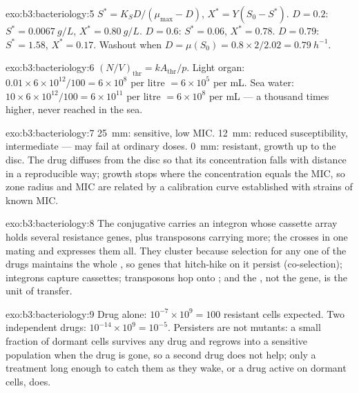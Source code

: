 \begin{solution}{exo:b3:bacteriology:5}
$S^{*} = K_{S}D/(\mu_{\max} - D)$, $X^{*} = Y(S_{0} - S^{*})$. $D = 0.2$:
$S^{*} = \qty{0.0067}{g/L}$, $X^{*} = \qty{0.80}{g/L}$. $D = 0.6$:
$S^{*} = 0.06$, $X^{*} = 0.78$. $D = 0.79$: $S^{*} = 1.58$, $X^{*} = 0.17$.
Washout when $D = \mu(S_{0}) = 0.8\times 2/2.02 = \qty{0.79}{h^{-1}}$.
\end{solution}

\begin{solution}{exo:b3:bacteriology:6}
$(N/V)_{\text{thr}} = kA_{\text{thr}}/p$. Light organ: $0.01\times
6\times 10^{12}/100 = 6\times 10^{8}$ per litre $= 6\times 10^{5}$ per
mL. Sea water: $10\times 6\times 10^{12}/100 = 6\times 10^{11}$ per litre
$= 6\times 10^{8}$ per mL --- a thousand times higher, never reached in
the sea.
\end{solution}

\begin{solution}{exo:b3:bacteriology:7}
\qty{25}{mm}: sensitive, low MIC. \qty{12}{mm}: reduced susceptibility,
intermediate --- may fail at ordinary doses. \qty{0}{mm}: resistant,
growth up to the disc. The drug diffuses from the disc so that its
concentration falls with distance in a reproducible way; growth stops
where the concentration equals the MIC, so zone radius and MIC are
related by a calibration curve established with strains of known MIC.
\end{solution}

\begin{solution}{exo:b3:bacteriology:8}
The conjugative  carries an integron whose cassette array holds
several resistance genes, plus transposons carrying more; the 
crosses in one mating and expresses them all. They cluster because
selection for any one of the drugs maintains the whole , so
genes that hitch-hike on it persist (co-selection); integrons capture
cassettes; transposons hop onto ; and the , not the
gene, is the unit of transfer.
\end{solution}

\begin{solution}{exo:b3:bacteriology:9}
Drug alone: $10^{-7}\times 10^{9} = 100$ resistant cells expected. Two
independent drugs: $10^{-14}\times 10^{9} = 10^{-5}$. Persisters are
not mutants: a small fraction of dormant cells survives any drug and
regrows into a sensitive population when the drug is gone, so a second
drug does not help; only a treatment long enough to catch them as they
wake, or a drug active on dormant cells, does.
\end{solution}

